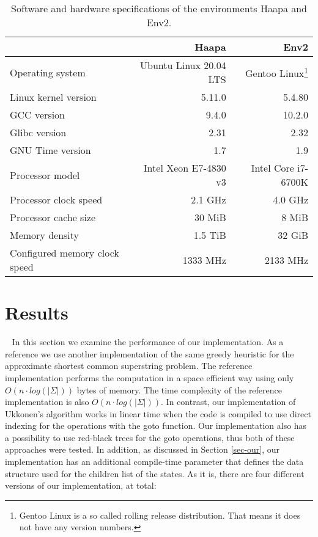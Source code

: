 \documentclass[english,twoside,censored,csm,algorithms-track-2020]{HYthesisML}
\theoremstyle{plain}
\theoremstyle{definition}
\begin{document}
\begin{table}
\begin{tabular}{l|r|r}
  & \textbf{Haapa} & \textbf{Env2} \\
  \hline
  Operating system & Ubuntu Linux 20.04 LTS & Gentoo Linux\footnote{Gentoo Linux is a so called rolling release distribution. That means it does not have any version numbers.} \\
  Linux kernel version & 5.11.0 & 5.4.80 \\
  GCC version & 9.4.0 & 10.2.0 \\
  Glibc version & 2.31 & 2.32 \\
  GNU Time version & 1.7 & 1.9 \\
  \hline
  Processor model & Intel Xeon E7-4830 v3 & Intel Core i7-6700K \\
  Processor clock speed & 2.1 GHz & 4.0 GHz \\
  Processor cache size & 30 MiB & 8 MiB \\
  Memory density & 1.5 TiB & 32 GiB \\
  Configured memory clock speed & 1333 MHz & 2133 MHz \\
\end{tabular}
\caption{Software and hardware specifications of the environments Haapa and Env2.}
\label{tbl-sys}
\end{table}



\section{Results}~\label{sec-results}
In this section we examine the performance of our implementation. As a reference we use another
implementation of the same greedy heuristic for the approximate shortest common superstring problem.
The reference implementation \citep{Alanko19} performs the computation in a space efficient way using
only $O(n \cdot log(|\Sigma|))$ bytes of memory. The time complexity of the reference implementation
is also $O(n \cdot log(|\Sigma|))$. In contrast, our implementation of Ukkonen's algorithm
works in linear time when the code is compiled to use direct indexing for the operations with
the goto function. Our implementation also has a possibility to use red-black trees for the goto
operations, thus both of these approaches were tested.
In addition, as discussed in Section
\ref{sec-our}, our implementation has an additional compile-time parameter that defines the data
structure used for the children list of the states. As it is, there are four different versions of
our implementation, at total:
\end{document}
